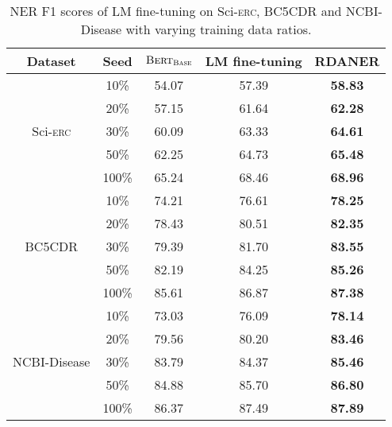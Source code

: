 \documentclass[10pt, conference, compsocconf]{IEEEtran}
\newcommand{\bert}{\textsc{Bert}\xspace}
\newcommand{\Scierc}{\textsc{S}ci-\textsc{erc}\xspace}
\newcommand{\rdaner}{\textsc{RDANER}\xspace}
\newcommand{\bertcs}{$\bert_{\textsc{CS}}$\xspace}
\newcommand{\bertbio}{$\bert_{\textsc{BIO}}$\xspace}
\newcommand{\bertbase}{$\bert_{\textsc{Base}}$\xspace}
\begin{document}
\begin{table}
    \caption{NER F1 scores of LM fine-tuning  on \Scierc, BC5CDR and NCBI-Disease with 
    varying training data ratios. 
    }\label{tal:results}
    \centering

    \begin{tabular}{c|c|ccc}
        \toprule
    Dataset      &  Seed  &       \bertbase & LM fine-tuning & \rdaner    \\ \hline
    \multirow{5}{*}{\Scierc}       & 10\%         & 54.07           & 57.39          & \textbf{58.83} \\
                                  & 20\%          & 57.15        & 61.64          & \textbf{62.28} \\
                                  & 30\%          & 60.09        & 63.33          & \textbf{64.61}          \\
                                  & 50\%          & 62.25        & 64.73          & \textbf{65.48}          \\
                                  & 100\%         & 65.24      & 68.46          & \textbf{68.96} \\ \hline
    \multirow{5}{*}{BC5CDR}       & 10\%          & 74.21     & 76.61          & \textbf{78.25}          \\
                                  & 20\%          & 78.43     & 80.51          & \textbf{82.35}          \\
                                  & 30\%          & 79.39      & 81.70          & \textbf{83.55}          \\
                                  & 50\%          & 82.19        & 84.25          & \textbf{85.26}          \\
                                  & 100\%         & 85.61                & 86.87          & \textbf{87.38}          \\ \hline
    \multirow{5}{*}{NCBI-Disease} & 10\%          & 73.03      & 76.09          & \textbf{78.14}          \\
                                  & 20\%          & 79.56       & 80.20          & \textbf{83.46}          \\
                                  & 30\%          & 83.79     & 84.37          & \textbf{85.46}          \\
                                  & 50\%          & 84.88     & 85.70          & \textbf{86.80}          \\
                                  & 100\%         & 86.37      & 87.49          & \textbf{87.89}          \\ 
    \bottomrule
    \end{tabular}
    \end{table}
\end{document}
